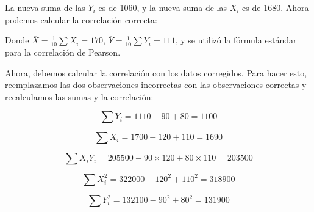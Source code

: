 \documentclass[
]{article}
\begin{document}
La nueva suma de las \(Y_i\) es de 1060, y la nueva suma de las \(X_i\)
es de 1680. Ahora podemos calcular la correlación correcta:

Donde \(\overline{X} = \frac{1}{10}\sum X_i = 170\),
\(\overline{Y} = \frac{1}{10}\sum Y_i = 111\), y se utilizó la fórmula
estándar para la correlación de Pearson.

Ahora, debemos calcular la correlación con los datos corregidos. Para
hacer esto, reemplazamos las dos observaciones incorrectas con las
observaciones correctas y recalculamos las sumas y la correlación:

\[\sum Y_i = 1110 - 90 + 80 = 1100\]

\[\sum X_i = 1700 - 120 + 110 = 1690\]

\[\sum X_iY_i = 205500 - 90 \times 120 + 80 \times 110 = 203500\]

\[\sum X_i^2 = 322000 - 120^2 + 110^2 = 318900\]

\[\sum Y_i^2 = 132100 - 90^2 + 80^2 = 131900\]
\end{document}
